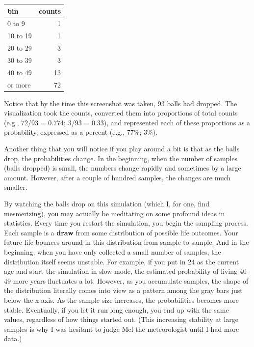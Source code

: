 \documentclass[openany]{book}
\begin{document}
\begin{table}[!h]
\centering\begin{table}[H]
\centering
\begin{tabular}{lr}
\toprule
bin & counts\\
\midrule
0 to 9 & 1\\
10 to 19 & 1\\
20 to 29 & 3\\
30 to 39 & 3\\
40 to 49 & 13\\
\addlinespace
50 or more & 72\\
\bottomrule
\end{tabular}
\end{table}
\end{table}

Notice that by the time this screenshot was taken, 93 balls had dropped. The visualization took the counts, converted them into proportions of total counts (e.g., 72/93 = 0.774; 3/93 = 0.33), and represented each of these proportions as a probability, expressed as a percent (e.g., 77\%; 3\%).

Another thing that you will notice if you play around a bit is that as the balls drop, the probabilities change. In the beginning, when the number of samples (balls dropped) is small, the numbers change rapidly and sometimes by a large amount. However, after a couple of hundred samples, the changes are much smaller.

By watching the balls drop on this simulation (which I, for one, find mesmerizing), you may actually be meditating on some profound ideas in statistics. Every time you restart the simulation, you begin the sampling process. Each sample is a \textbf{draw} from some distribution of possible life outcomes. Your future life bounces around in this distribution from sample to sample. And in the beginning, when you have only collected a small number of samples, the distribution itself seems unstable. For example, if you put in 24 as the current age and start the simulation in slow mode, the estimated probability of living 40-49 more years fluctuates a lot. However, as you accumulate samples, the shape of the distribution literally comes into view as a pattern among the gray bars just below the x-axis. As the sample size increases, the probabilities becomes more stable. Eventually, if you let it run long enough, you end up with the same values, regardless of how things started out. (This increasing stability at large samples is why I was hesitant to judge Mel the meteorologist until I had more data.)
\end{document}
